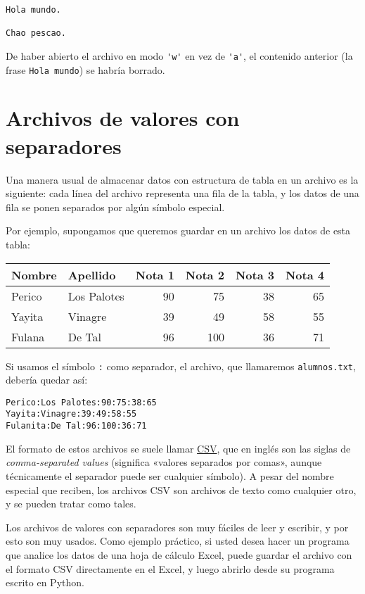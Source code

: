 \begin{lstlisting}[language=file]
Hola mundo.

Chao pescao.
\end{lstlisting}

De haber abierto el archivo en modo \lstinline!'w'! en vez de
\lstinline!'a'!, el contenido anterior (la frase \lstinline!Hola mundo!)
se habría borrado.

\section{Archivos de valores con separadores}

Una manera usual de almacenar datos con estructura de tabla en un
archivo es la siguiente: cada línea del archivo representa una fila de
la tabla, y los datos de una fila se ponen separados por algún símbolo
especial.

Por ejemplo, supongamos que queremos guardar en un archivo los datos de
esta tabla:

\begin{tabular}{llrrrr}
  \toprule
    Nombre & Apellido & Nota 1 & Nota 2 & Nota 3 & Nota 4 \\
  \midrule
    Perico & Los Palotes & 90 & 75 & 38 & 65 \\
    Yayita & Vinagre & 39 & 49 & 58 & 55 \\
    Fulana & De Tal & 96 & 100 & 36 & 71 \\
  \bottomrule
\end{tabular}

Si usamos el símbolo \lstinline!:! como separador, el archivo, que
llamaremos \lstinline!alumnos.txt!, debería quedar así:

\begin{lstlisting}[language=file]
Perico:Los Palotes:90:75:38:65
Yayita:Vinagre:39:49:58:55
Fulanita:De Tal:96:100:36:71
\end{lstlisting}

El formato de estos archivos se suele llamar
\href{http://en.wikipedia.org/wiki/CSV\_(file\_format)}{CSV}, que en
inglés son las siglas de \emph{comma-separated values} (significa
«valores separados por comas», aunque técnicamente el separador puede
ser cualquier símbolo). A pesar del nombre especial que reciben, los
archivos CSV son archivos de texto como cualquier otro, y se pueden
tratar como tales.

Los archivos de valores con separadores son muy fáciles de leer y
escribir, y por esto son muy usados. Como ejemplo práctico, si usted
desea hacer un programa que analice los datos de una hoja de cálculo
Excel, puede guardar el archivo con el formato CSV directamente en el
Excel, y luego abrirlo desde su programa escrito en Python.

